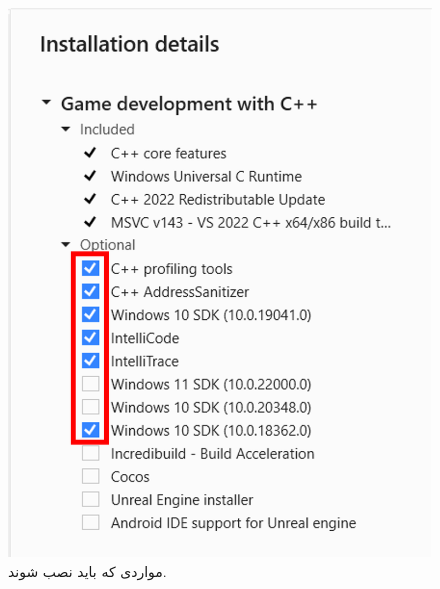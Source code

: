 {\begin{figure}[H]
        \includegraphics[scale=0.7]{Images/1.Intro.3.4.png}
        \caption*{مواردی که باید نصب شوند.}
    \end{figure}
}
\textbf{\vspace{12pt}}

\title{
    \Large
}

